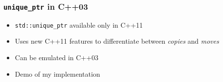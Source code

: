 \begin{frame}[fragile]
    \frametitle{\texttt{unique\_ptr} in C++03}
    \begin{itemize}
        \item \texttt{std::unique\_ptr} available only in C++11
        \item Uses new C++11 features to differentiate between \emph{copies} and \emph{moves}
        \item Can be emulated in C++03
        \item Demo of my implementation
    \end{itemize}
\end{frame}



